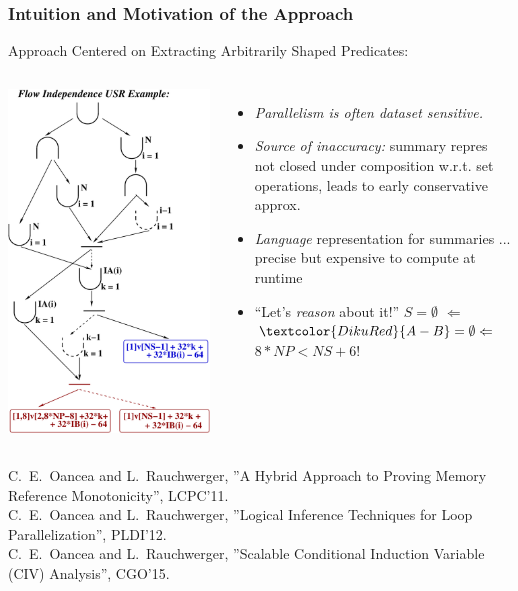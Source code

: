 \documentclass{beamer}
\renewcommand{\emph}[1]{\textcolor{structure}{#1}}
\newcommand{\emp}[1]{\textcolor{DikuRed}{ #1}}
\begin{document}
\begin{frame}[fragile,t]
  \frametitle{Intuition and Motivation of the Approach}

\begin{block}{Approach Centered on Extracting Arbitrarily Shaped Predicates:} 
\begin{columns}
\includegraphics[height=28ex]{Figures/USR_HE_FIND_SOLVH}
\vspace{-1ex}
\begin{itemize}
    \item \emp{\em Parallelism is often dataset sensitive.}\pause\medskip
    \item \emp{{\em Source of inaccuracy:}} summary repres not closed under composition w.r.t. set operations, leads to early conservative approx.\pause \medskip
    \item \emph{{\em Language}} representation for summaries ... precise but \emp{expensive} to compute at runtime \pause \medskip
    \item ``Let's \emph{{\em reason}} about it!'' $S=\emptyset$ $\Leftarrow$ $\emp{A - B} = \emptyset \Leftarrow$ \emph{$8*NP < NS + 6$}!
\end{itemize}
\end{columns}
\end{block}


{\tiny C.~E.~Oancea and L.~Rauchwerger, ''A Hybrid Approach to Proving Memory Reference Monotonicity'', LCPC'11.}\\
{\tiny C.~E.~Oancea and L.~Rauchwerger, ''Logical Inference Techniques for Loop Parallelization'', PLDI'12.}\\
{\tiny C.~E.~Oancea and L.~Rauchwerger, ''Scalable Conditional Induction Variable (CIV) Analysis'', CGO'15.}

\end{frame}
\end{document}
